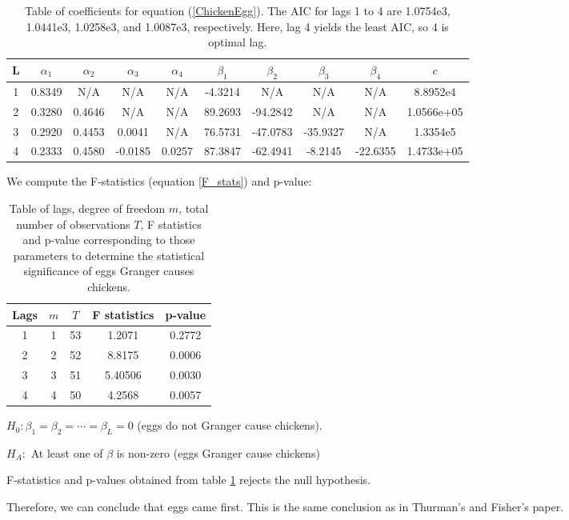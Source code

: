 \documentclass[]{article}
\begin{document}
\begin{table}
	\begin{tabular}{ | c | c c c c c c c c c |}
		\hline
		L & $\alpha_1$ &  $\alpha_2$& $\alpha_3$ & $\alpha_4$ & $\beta_1$ &  $\beta_2$& $\beta_3$ & $\beta_4$  & $c$  \\ \hline 
		1 & 0.8349 & N/A & N/A & N/A & -4.3214 & N/A & N/A & N/A & 8.8952e4 \\  \hline 
		2 & 0.3280 & 0.4646 & N/A & N/A & 89.2693 & -94.2842 & N/A & N/A & 1.0566e+05  \\  \hline 
		3 & 0.2920 & 0.4453 & 0.0041 & N/A & 76.5731 & -47.0783 & -35.9327 & N/A & 1.3354e5\\  \hline 
		4 & 0.2333& 0.4580 & -0.0185 & 0.0257 & 87.3847 & -62.4941 & -8.2145 & -22.6355 & 1.4733e+05 \\  \hline 
	\end{tabular}
	\caption{Table of coefficients for equation (\ref{ChickenEgg}). The AIC for lags 1 to 4 are 1.0754e3, 1.0441e3, 1.0258e3, and 1.0087e3, respectively. Here, lag 4 yields the least AIC, so 4 is optimal lag.}
\end{table}

We compute the F-statistics (equation \ref{F_stats}) and p-value:
\begin{table}[H]
	\begin{center}
		\begin{tabular}{ | c | c | c |c | c | }
			\hline
			Lags & $m$ &  $T$& F statistics & p-value   \\ \hline 
			1 & 1 & 53 & 1.2071 & 0.2772  \\ \hline 
			2 & 2 & 52 & 8.8175 & 0.0006 \\ \hline 
			3 & 3 & 51 & 5.40506 & 0.0030 \\ \hline 
			4 & 4 & 50 & 4.2568 & 0.0057 \\ \hline 
		\end{tabular}
		\caption{Table of lags, degree of freedom $m$, total number of observations $T$, F statistics and p-value corresponding to those parameters to determine the statistical significance of eggs Granger causes chickens.}
		\label{EC_stats}
	\end{center}
\end{table}

$H_0: \beta_1 = \beta_2 = \cdots = \beta_L = 0$ (eggs do not Granger cause chickens).

$H_A:$ At least one of $\beta$ is non-zero (eggs Granger cause chickens)

F-statistics and p-values obtained from table \ref{EC_stats} rejects the null hypothesis.

Therefore, we can conclude that eggs came first. This is the same conclusion as in Thurman's and Fisher's paper.
\end{document}
